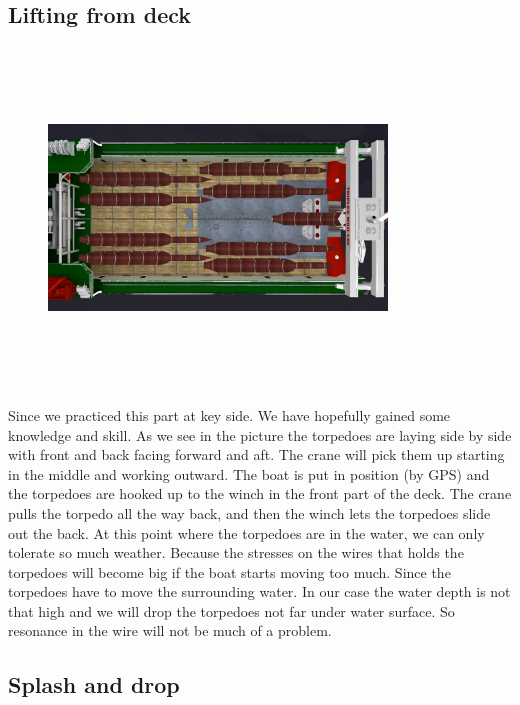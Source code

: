 \documentclass[DIV=calc, paper=a4, fontsize=13pt, twocolumn]{scrartcl}	 %
\begin{document}
\subsection*{Lifting from deck}
\begin{figure}[h]
\includegraphics[width=9cm,height=9cm]{Triplex_MDH_140.jpg}
\end{figure}
Since we practiced this part at key side. We have hopefully gained some knowledge and skill. As we see in the picture the torpedoes are laying side by side with front and back facing forward and aft. The crane will pick them up starting in the middle and working outward. The boat is put in position (by GPS) and the torpedoes are hooked up to the winch in the front part of the deck. The crane pulls the torpedo all the way back, and then the winch lets the torpedoes slide out the back. At this point where the torpedoes are in the water, we can only tolerate so much weather. Because the stresses on the wires that holds the torpedoes will become big if the boat starts moving too much. Since the torpedoes have to move the surrounding water. In our case the water depth is not that high and we will drop the torpedoes not far under water surface. So resonance in the wire will not be much of a problem. 
\subsection*{Splash and drop}
\end{document}
